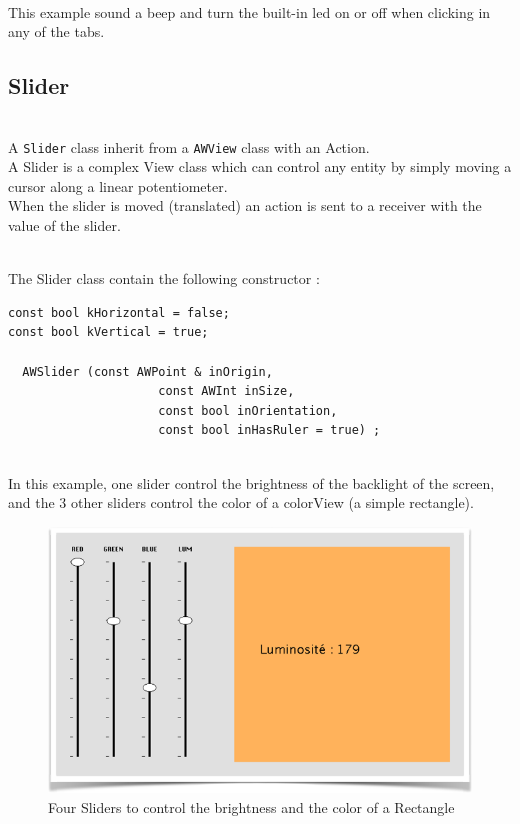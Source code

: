 \documentclass[a4paper,11pt]{extarticle}
\begin{document}
~\\ This example sound a beep and turn the built-in led on or off when clicking in any of the tabs.



\newpage
\subsection{Slider}

~\\ A \texttt{Slider} class inherit from a \texttt{AWView} class with an Action.
~\\ A Slider is a complex View class which can control any entity by simply moving a cursor along a linear potentiometer.
~\\ When the slider is moved (translated) an action is sent to a receiver with the value of the slider.

~\\ The Slider class contain the following constructor :

\begin{lstlisting}[language=Arduinonl]
const bool kHorizontal = false;
const bool kVertical = true;

  AWSlider (const AWPoint & inOrigin,
                     const AWInt inSize,
                     const bool inOrientation,
                     const bool inHasRuler = true) ;
\end{lstlisting}

~\\ In this example, one slider control the brightness of the backlight of the screen, and the 3 other sliders control the color of a colorView (a simple rectangle).

\begin{figure}[htbp]
   \centering
   \includegraphics[scale=0.7]{AWFig12.png} 
   \caption{Four Sliders to control the brightness and the color of a Rectangle}
   \label{fig:12 }
\end{figure}
\end{document}
